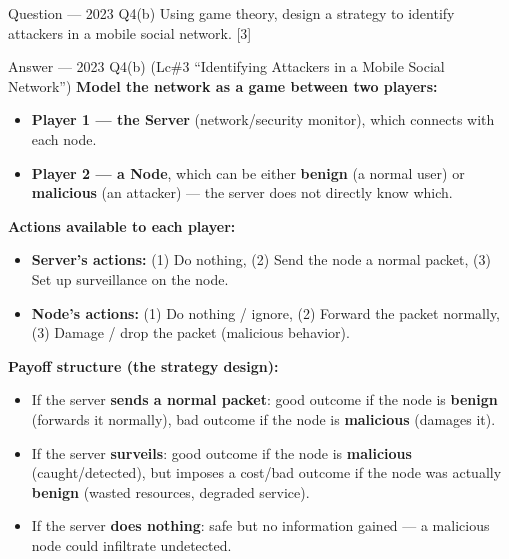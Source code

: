 \documentclass[12pt,a4paper]{article}
\begin{document}
\begin{qbox}{Question --- 2023 Q4(b)}
Using game theory, design a strategy to identify attackers in a mobile social network. \hfill [3]
\end{qbox}

\begin{solbox}{Answer --- 2023 Q4(b) (Lc\#3 ``Identifying Attackers in a Mobile Social Network'')}
\textbf{Model the network as a game between two players:}
\begin{itemize}[noitemsep]
  \item \textbf{Player 1 --- the Server} (network/security monitor), which connects with each node.
  \item \textbf{Player 2 --- a Node}, which can be either \textbf{benign} (a normal user) or \textbf{malicious} (an attacker) --- the server does not directly know which.
\end{itemize}

\textbf{Actions available to each player:}
\begin{itemize}[noitemsep]
  \item \textbf{Server's actions:} (1) Do nothing, (2) Send the node a normal packet, (3) Set up surveillance on the node.
  \item \textbf{Node's actions:} (1) Do nothing / ignore, (2) Forward the packet normally, (3) Damage / drop the packet (malicious behavior).
\end{itemize}

\textbf{Payoff structure (the strategy design):}
\begin{itemize}[noitemsep]
  \item If the server \textbf{sends a normal packet}: good outcome if the node is \textbf{benign} (forwards it normally), bad outcome if the node is \textbf{malicious} (damages it).
  \item If the server \textbf{surveils}: good outcome if the node is \textbf{malicious} (caught/detected), but imposes a cost/bad outcome if the node was actually \textbf{benign} (wasted resources, degraded service).
  \item If the server \textbf{does nothing}: safe but no information gained --- a malicious node could infiltrate undetected.
\end{itemize}


\end{solbox}
\end{document}
